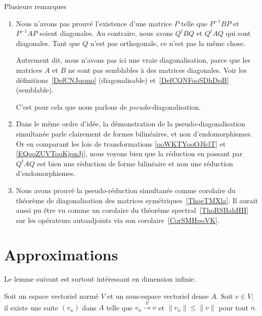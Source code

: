 \begin{remark}      \label{REMooDDUEooJXZIfE}
	Plusieurs remarques
	\begin{enumerate}
		\item
		      Nous n'avons pas prouvé l'existence d'une matrice \( P\) telle que \( P^{-1}BP\) et \( P^{-1}AP\) soient diagonales. Au contraire, nous avons \( Q^tBQ\) et \( Q^tAQ\) qui sont diagonales. Tant que \( Q\) n'est pas orthogonale, ce n'est pas la même chose.

		      Autrement dit, nous n'avons pas ici une vraie diagonalisation, parce que les matrices \( A\) et \( B\) ne sont pas semblables à des matrices diagonales. Voir les définitions~\ref{DefCNJqsmo} (diagonalisable) et~\ref{DefCQNFooSDhDpB} (semblable).

		      C'est pour cela que nous parlons de \emph{pseudo}-diagonalisation.
		\item
		      Dans le même ordre d'idée, la démonstration de la pseudo-diagonalisation simultanée parle clairement de formes bilinéaires, et non d'endomorphismes. Or en comparant les lois de transformations \eqref{ooWKTYooOJfclT} et \eqref{EQooZUVTooKjqnJj}, nous voyons bien que la réduction en passant par \( Q^tAQ\) est bien une réduction de forme bilinéaire et non une réduction d'endomorphismes.
		\item
		      Nous avons prouvé la pseudo-réduction simultanée comme corolaire du théorème de diagonalisation des matrices symétriques~\ref{ThoeTMXla}. Il aurait aussi pu être vu comme un corolaire du théorème spectral~\ref{ThoRSBahHH} sur les opérateurs autoadjoints via son corolaire~\ref{CorSMHpoVK}.
	\end{enumerate}
\end{remark}

\section{Approximations}

Le lemme suivant est surtout intéressant en dimension infinie.
\begin{lemma}
	Soit un espace vectoriel normé \( V\) et un sous-espace vectoriel dense \( A\). Soit \( v\in V\); il existe une suite \( (v_n)\) dans \( A\) telle que \( v_n\stackrel{V}{\longrightarrow}v\) et \( \| v_n \|\leq \| v \|\) pour tout \( n\).
\end{lemma}

